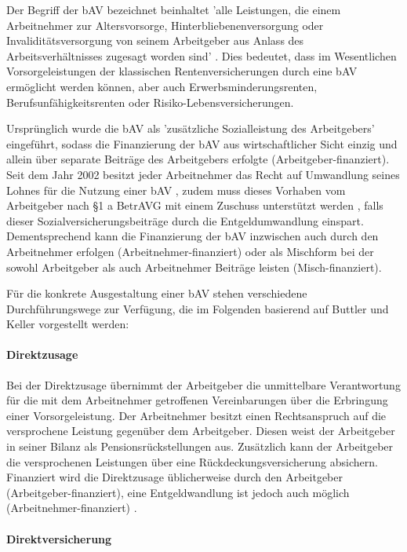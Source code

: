 Der Begriff der bAV bezeichnet beinhaltet 'alle Leistungen, die einem Arbeitnehmer zur Altersvorsorge, Hinterbliebenenversorgung oder Invaliditätsversorgung von seinem Arbeitgeber aus Anlass des Arbeitsverhältnisses zugesagt worden sind' \cite[S. 1]{buttler2017einfuehrung}. Dies bedeutet, dass im Wesentlichen Vorsorgeleistungen der klassischen Rentenversicherungen durch eine bAV ermöglicht werden können, aber auch Erwerbsminderungsrenten, Berufsunfähigkeitsrenten oder Risiko-Lebensversicherungen. 

Ursprünglich wurde die bAV als 'zusätzliche Sozialleistung des Arbeitgebers' \cite[S. 7]{buttler2017einfuehrung} eingeführt, sodass die Finanzierung der bAV aus wirtschaftlicher Sicht einzig und allein über separate Beiträge des Arbeitgebers erfolgte (Arbeitgeber-finanziert). Seit dem Jahr 2002 besitzt jeder Arbeitnehmer das Recht auf Umwandlung seines Lohnes für die Nutzung einer bAV \cite[S. 23]{buttler2017einfuehrung}, zudem muss dieses Vorhaben vom Arbeitgeber nach §1 a BetrAVG mit einem Zuschuss unterstützt werden \cite[S. 29]{buttler2017einfuehrung}, falls dieser Sozialversicherungsbeiträge durch die Entgeldumwandlung einspart. Dementsprechend kann die Finanzierung der bAV inzwischen auch durch den Arbeitnehmer erfolgen (Arbeitnehmer-finanziert) oder als Mischform bei der sowohl Arbeitgeber als auch Arbeitnehmer Beiträge leisten (Misch-finanziert).

Für die konkrete Ausgestaltung einer bAV stehen verschiedene Durchführungswege zur Verfügung, die im Folgenden basierend auf Buttler und Keller \cite{buttler2017einfuehrung} vorgestellt werden:

\paragraph*{Direktzusage}
Bei der Direktzusage übernimmt der Arbeitgeber die unmittelbare Verantwortung für die mit dem Arbeitnehmer getroffenen Vereinbarungen über die Erbringung einer Vorsorgeleistung. Der Arbeitnehmer besitzt einen Rechtsanspruch auf die versprochene Leistung gegenüber dem Arbeitgeber. Diesen weist der Arbeitgeber in seiner Bilanz als Pensionsrückstellungen aus. Zusätzlich kann der Arbeitgeber die versprochenen Leistungen über eine Rückdeckungsversicherung absichern. Finanziert wird die Direktzusage üblicherweise durch den Arbeitgeber  (Arbeitgeber-finanziert), eine Entgeldwandlung ist jedoch auch möglich (Arbeitnehmer-finanziert) \cite[S. 140]{buttler2017einfuehrung}.

\paragraph*{Direktversicherung}

